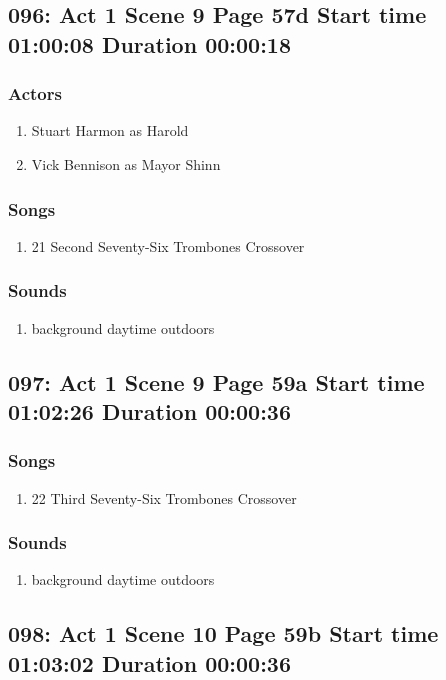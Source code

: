 \subsection{096: Act 1 Scene 9 Page 57d Start time 01:00:08 Duration 00:00:18}

\subsubsection{Actors}
\begin{enumerate}
\item Stuart Harmon as Harold
\item Vick Bennison as Mayor Shinn
\end{enumerate}

\subsubsection{Songs}
\begin{enumerate}
\item 21 Second Seventy-Six Trombones Crossover
\end{enumerate}\subsubsection{Sounds}
\begin{enumerate}
\item background daytime outdoors
\end{enumerate}
\subsection{097: Act 1 Scene 9 Page 59a Start time 01:02:26 Duration 00:00:36}
\subsubsection{Songs}
\begin{enumerate}
\item 22 Third Seventy-Six Trombones Crossover
\end{enumerate}\subsubsection{Sounds}
\begin{enumerate}
\item background daytime outdoors
\end{enumerate}
\subsection{098: Act 1 Scene 10 Page 59b Start time 01:03:02 Duration 00:00:36}

